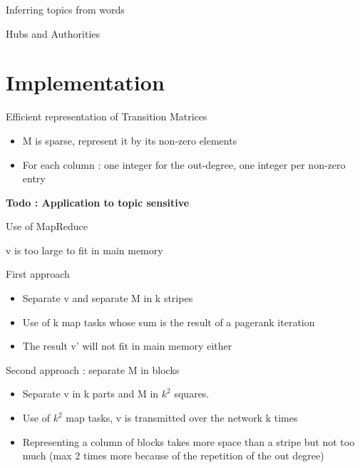 \documentclass[10pt]{beamer}
\begin{document}
\begin{frame}{Inferring topics from words}

\end{frame}


\begin{frame}{Hubs and Authorities}
\end{frame}


\section{Implementation}
\begin{frame}{Efficient representation of Transition Matrices}
  \begin{itemize}
    \item M is sparse, represent it by its non-zero elements
    \item For each column : one integer for the out-degree, one integer per non-zero entry
  \end{itemize}
  \textbf{Todo : Application to topic sensitive}
\end{frame}

\begin{frame}{Use of MapReduce}
\begin{center}v  is too large to fit in main memory \end{center}
  \begin{block}{First approach}
    \begin{itemize}
      \item Separate v and separate M in k stripes
      \item Use of k map tasks whose sum is the result of a pagerank iteration
      \item The result v' will not fit in main memory either
    \end{itemize}
  \end{block}
  \begin{block}{Second approach : separate M in blocks}
    \begin{itemize}
      \item Separate v in k parts and M in $k^2$ squares.
      \item Use of $k^2$ map tasks, v is transmitted over the network k times
      \item Representing a column of blocks takes more space than a stripe but not too much (max 2 times more because of the repetition of the out degree)
    \end{itemize}
  \end{block}
\end{frame}
\end{document}
